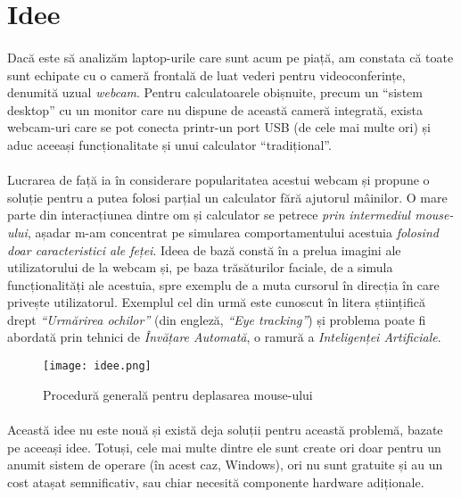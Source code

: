 \section*{Idee}
\paragraph{}
Dacă este să analizăm laptop-urile care sunt acum pe piață, am constata că toate sunt echipate cu o cameră frontală de luat vederi pentru videoconferințe, denumită uzual \emph{webcam}.
Pentru calculatoarele obișnuite, precum un ``sistem desktop'' cu un monitor care nu dispune de această cameră integrată, exista webcam-uri care se pot conecta printr-un port USB (de cele mai multe ori) și aduc aceeași funcționalitate și unui calculator ``tradițional''.

\paragraph{}
Lucrarea de față ia în considerare popularitatea acestui webcam și propune o soluție pentru a putea folosi parțial un calculator fără ajutorul mâinilor.
O mare parte din interacțiunea dintre om și calculator se petrece \emph{prin intermediul mouse-ului}, așadar m-am concentrat pe simularea comportamentului acestuia \emph{folosind doar caracteristici ale feței}.
Ideea de bază constă în a prelua imagini ale utilizatorului de la webcam și, pe baza trăsăturilor faciale, de a simula funcționalități ale acestuia, spre exemplu de a muta cursorul în direcția în care privește utilizatorul.
Exemplul cel din urmă este cunoscut în litera științifică drept \emph{``Urmărirea ochilor''} (din engleză, \emph{``Eye tracking''}) și problema poate fi abordată prin tehnici de \emph{Învățare Automată}, o ramură a \emph{Inteligenței Artificiale}.

\begin{figure}[h]
    \centering
    \texttt{[image: idee.png]}
    \caption{Procedură generală pentru deplasarea mouse-ului}
\end{figure}

\paragraph{}
Această idee nu este nouă și există deja soluții pentru această problemă, bazate pe aceeași idee.
Totuși, cele mai multe dintre ele sunt create ori doar pentru un anumit sistem de operare (în acest caz, Windows), ori nu sunt gratuite și au un cost atașat semnificativ, sau chiar necesită componente hardware adiționale.

